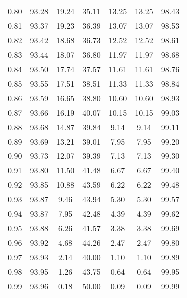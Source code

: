 \begin{tabular}{|c|c|c|c|c|c|c|}
      0.80 &     93.28 &     19.24 &      35.11 &   13.25 &      13.25 &         98.43 \\
      0.81 &     93.37 &     19.23 &      36.39 &   13.07 &      13.07 &         98.53 \\
      0.82 &     93.42 &     18.68 &      36.73 &   12.52 &      12.52 &         98.61 \\
      0.83 &     93.44 &     18.07 &      36.80 &   11.97 &      11.97 &         98.68 \\
      0.84 &     93.50 &     17.74 &      37.57 &   11.61 &      11.61 &         98.76 \\
      0.85 &     93.55 &     17.51 &      38.51 &   11.33 &      11.33 &         98.84 \\
      0.86 &     93.59 &     16.65 &      38.80 &   10.60 &      10.60 &         98.93 \\
      0.87 &     93.66 &     16.19 &      40.07 &   10.15 &      10.15 &         99.03 \\
      0.88 &     93.68 &     14.87 &      39.84 &    9.14 &       9.14 &         99.11 \\
      0.89 &     93.69 &     13.21 &      39.01 &    7.95 &       7.95 &         99.20 \\
      0.90 &     93.73 &     12.07 &      39.39 &    7.13 &       7.13 &         99.30 \\
      0.91 &     93.80 &     11.50 &      41.48 &    6.67 &       6.67 &         99.40 \\
      0.92 &     93.85 &     10.88 &      43.59 &    6.22 &       6.22 &         99.48 \\
      0.93 &     93.87 &      9.46 &      43.94 &    5.30 &       5.30 &         99.57 \\
      0.94 &     93.87 &      7.95 &      42.48 &    4.39 &       4.39 &         99.62 \\
      0.95 &     93.88 &      6.26 &      41.57 &    3.38 &       3.38 &         99.69 \\
      0.96 &     93.92 &      4.68 &      44.26 &    2.47 &       2.47 &         99.80 \\
      0.97 &     93.93 &      2.14 &      40.00 &    1.10 &       1.10 &         99.89 \\
      0.98 &     93.95 &      1.26 &      43.75 &    0.64 &       0.64 &         99.95 \\
      0.99 &     93.96 &      0.18 &      50.00 &    0.09 &       0.09 &         99.99 \\
\bottomrule
\end{tabular}
